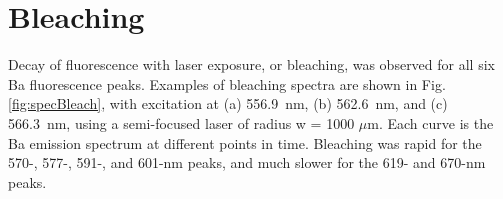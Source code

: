


\section{Bleaching}
\label{sec:bleaching}


Decay of fluorescence with laser exposure, or bleaching, was observed for all six Ba fluorescence peaks.  Examples of bleaching spectra are shown in Fig. \ref{fig:specBleach}, with excitation at (a) 556.9~nm, (b) 562.6~nm, and (c) 566.3~nm, using a semi-focused laser of radius w = 1000 $\mu$m.  Each curve is the Ba emission spectrum at different points in time.  Bleaching was rapid for the 570-, 577-, 591-, and 601-nm peaks, and much slower for the 619- and 670-nm peaks.

